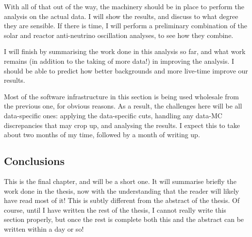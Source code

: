 With all of that out of the way, the machinery should be in place to perform the analysis on the actual data. I will show the results, and discuss to what degree they are sensible. If there is time, I will perform a preliminary combination of the solar and reactor anti-neutrino oscillation analyses, to see how they combine.

I will finish by summarising the work done in this analysis so far, and what work remains (in addition to the taking of more data!) in improving the analysis. I should be able to predict how better backgrounds and more live-time improve our results.

Most of the software infrastructure in this section is being used wholesale from the previous one, for obvious reasons. As a result, the challenges here will be all data-specific ones: applying the data-specific cuts, handling any data-MC discrepancies that may crop up, and analysing the results. I expect this to take about two months of my time, followed by a month of writing up.

\subsection{Conclusions}
This is the final chapter, and will be a short one. It will summarise briefly the work done in the thesis, now with the understanding that the reader will likely have read most of it! This is subtly different from the abstract of the thesis. Of course, until I have written the rest of the thesis, I cannot really write this section properly, but once the rest is complete both this and the abstract can be written within a day or so!

\printbibliography